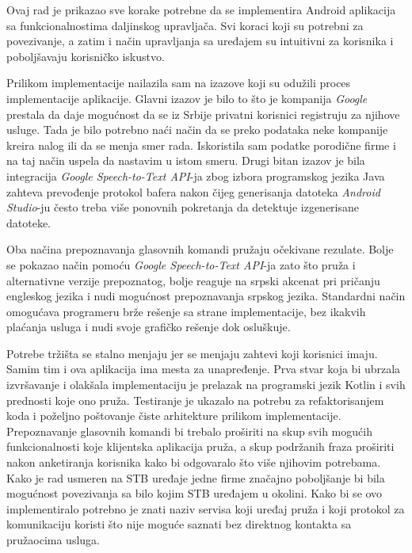\documentclass[TamaraIvanovicMasterRad.tex]{subfiles}
\begin{document}
Ovaj rad je prikazao sve korake potrebne da se implementira Android aplikacija sa funkcionalnostima daljinskog upravljača. Svi koraci koji su potrebni za povezivanje, a zatim i način upravljanja sa uređajem su intuitivni za korisnika i poboljšavaju korisničko iskustvo.

Prilikom implementacije nailazila sam na izazove koji su odužili proces implementacije aplikacije. Glavni izazov je bilo to što je kompanija \textit{Google} prestala da daje mogućnost da se iz Srbije privatni korisnici registruju za njihove usluge. Tada je bilo potrebno naći način da se preko podataka neke kompanije kreira nalog ili da se menja smer rada. Iskoristila sam podatke porodične firme i na taj način uspela da nastavim u istom smeru. Drugi bitan izazov je bila integracija \textit{Google Speech-to-Text API}-ja zbog izbora programskog jezika Java zahteva prevođenje protokol bafera nakon čijeg generisanja datoteka \textit{Android Studio}-ju često treba više ponovnih pokretanja da detektuje izgenerisane datoteke. 

Oba načina prepoznavanja glasovnih komandi pružaju očekivane rezulate. Bolje se pokazao način pomoću \textit{Google Speech-to-Text API}-ja zato što pruža i alternativne verzije prepoznatog, bolje reaguje na srpski akcenat pri pričanju engleskog jezika i nudi mogućnost prepoznavanja srpskog jezika. Standardni način omogućava programeru brže rešenje sa strane implementacije, bez ikakvih plaćanja usluga i nudi svoje grafičko rešenje dok osluškuje. 

Potrebe tržišta se stalno menjaju jer se menjaju zahtevi koji korisnici imaju. Samim tim i ova aplikacija ima mesta za unapređenje. Prva stvar koja bi ubrzala izvršavanje i olakšala implementaciju je prelazak na programski jezik Kotlin i svih prednosti koje ono pruža. Testiranje je ukazalo na potrebu za refaktorisanjem koda i poželjno poštovanje čiste arhitekture prilikom implementacije. Prepoznavanje glasovnih komandi bi trebalo proširiti na skup svih mogućih funkcionalnosti koje klijentska aplikacija pruža, a skup podržanih fraza proširiti nakon anketiranja korisnika kako bi odgovaralo što više njihovim potrebama. Kako je rad usmeren na STB uređaje jedne firme značajno poboljšanje bi bila mogućnost povezivanja sa bilo kojim STB uređajem u okolini. Kako bi se ovo implementiralo potrebno je znati naziv servisa koji uređaj pruža i koji protokol za komunikaciju koristi što nije moguće saznati bez direktnog kontakta sa pružaocima usluga.
\end{document}
